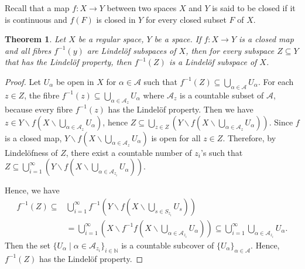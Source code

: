 \documentclass[12pt,oneside,english]{amsbook}
\numberwithin{equation}{section} %
\numberwithin{figure}{section} %
\theoremstyle{plain}
\numberwithin{section}{chapter}
\newtheorem{thm}{Theorem}[section]
\theoremstyle{plain}
\begin{document}
Recall that a map $f:X \to Y$ between two spaces $X$ and $Y$ is said to be closed if it is continuous and $f(F)$ is closed in $Y$ for every closed subset $F$ of $X$.
\begin{thm}\label{lindelof:thm:12}
  Let $X$ be a regular space, $Y$ be a space. If $f: X \to Y$ is a closed map and all fibres $f^{-1}(y)$ are  Lindel\"{o}f subspaces of $X$, then for every subspace $Z \subseteq Y$ that has the Lindel\"{o}f property, then $f^{-1}(Z)$ is a Lindel\"{o}f subspace of $X$.
\end{thm}

\begin{proof}
  Let $U_{\alpha}$ be open in $X$ for $\alpha \in \mathcal{A}$ such that $f^{-1}(Z) \subseteq \bigcup_{\alpha \in \mathcal{A}}U_{\alpha}$. For each $z \in Z$, the fibre $f^{-1}(z) \subseteq \bigcup_{\alpha \in \mathcal{A}_z}U_{\alpha}$ where $\mathcal{A}_z$ is a countable subset of $\mathcal{A}$, because every fibre $f^{-1}(z)$ has the Lindel\"{o}f property. Then we have $z \in Y \backslash f(X \backslash \bigcup_{\alpha \in \mathcal{A}_z}U_{\alpha})$, hence $Z \subseteq \bigcup_{z \in Z}(Y \backslash f(X \backslash \bigcup_{\alpha \in \mathcal{A}_z}U_{\alpha}))$. Since $f$ is a closed map, $Y \backslash f(X \backslash \bigcup_{\alpha \in \mathcal{A}_z}U_{\alpha})$ is open for all $z \in Z$. Therefore, by  Lindel\"{o}fness of $Z$, there exist a countable number of $z_i$'s such that $Z \subseteq \bigcup_{i = 1}^{\infty}(Y \backslash f(X \backslash \bigcup_{\alpha \in \mathcal{A}_{z_i}}U_{\alpha}))$.

  Hence, we have
  \begin{align*} f^{-1}(Z) \subseteq & \bigcup_{i = 1}^{\infty}f^{-1}(Y \backslash f(X \backslash \bigcup_{s \in S_{z_i}}U_{s})) \\
    & = \bigcup_{i = 1}^{\infty}(X \backslash  f^{-1}f(X \backslash \bigcup_{\alpha \in \mathcal{A}_{z_i}}U_{\alpha})) \subseteq  \bigcup_{i = 1}^{\infty}\bigcup_{\alpha \in \mathcal{A}_{z_i}}U_{\alpha}.
  \end{align*}
Then the set $\{U_{\alpha} \; | \; \alpha \in \mathcal{A}_{z_i} \}_{i \in \mathbb{N}}$ is a countable subcover of $\{U_{\alpha}\}_{\alpha \in \mathcal{A}}$. Hence, $f^{-1}(Z)$ has the Lindel\"{o}f property.
\end{proof}
\end{document}
